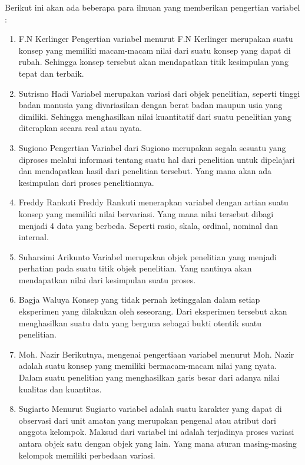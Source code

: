 Berikut ini akan ada beberapa para ilmuan yang memberikan pengertian variabel :
\begin{enumerate}
    \item F.N Kerlinger
Pengertian variabel menurut F.N Kerlinger merupakan suatu konsep yang memiliki macam-macam nilai dari suatu konsep yang dapat di rubah. Sehingga konsep tersebut akan mendapatkan titik kesimpulan yang tepat dan terbaik.

    \item Sutrisno Hadi
Variabel merupakan variasi dari objek penelitian, seperti tinggi badan manusia yang divariasikan dengan berat badan maupun usia yang dimiliki. Sehingga menghasilkan nilai kuantitatif dari suatu penelitian yang diterapkan secara real atau nyata.

    \item Sugiono
Pengertian Variabel dari Sugiono merupakan segala sesuatu yang diproses melalui informasi tentang suatu hal dari penelitian untuk dipelajari dan mendapatkan hasil dari penelitian tersebut. Yang mana akan ada kesimpulan dari proses penelitiannya.

    \item Freddy Rankuti
Freddy Rankuti menerapkan variabel dengan artian suatu konsep yang memiliki nilai bervariasi. Yang mana nilai tersebut dibagi menjadi 4 data yang berbeda. Seperti rasio, skala, ordinal, nominal dan internal.

    \item Suharsimi Arikunto
Variabel merupakan objek penelitian yang menjadi perhatian pada suatu titik objek penelitian. Yang nantinya akan mendapatkan nilai dari kesimpulan suatu proses.

    \item Bagja Waluya
Konsep yang tidak pernah ketinggalan dalam setiap eksperimen yang dilakukan oleh seseorang. Dari eksperimen tersebut akan menghasilkan suatu data yang berguna sebagai bukti otentik suatu penelitian.

    \item Moh. Nazir
Berikutnya, mengenai pengertiaan variabel menurut Moh. Nazir adalah suatu konsep yang memiliki bermacam-macam nilai yang nyata. Dalam suatu penelitian yang menghasilkan garis besar dari adanya nilai kualitas dan kuantitas.

    \item Sugiarto
Menurut Sugiarto variabel adalah suatu karakter yang dapat di observasi dari unit amatan yang merupakan pengenal atau atribut dari anggota kelompok. Maksud dari variabel ini adalah terjadinya proses variasi antara objek satu dengan objek yang lain. Yang mana aturan masing-masing kelompok memiliki perbedaan variasi.


\end{enumerate}

